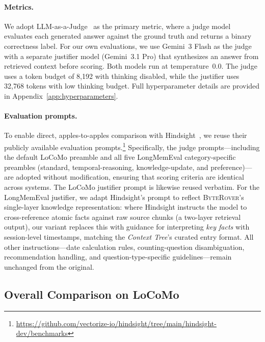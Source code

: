 \documentclass[11pt]{article}
\newcommand{\byterover}{\textsc{ByteRover}}
\newcommand{\contexttree}{\textit{Context Tree}}
\begin{document}
\paragraph{Metrics.}
We adopt LLM-as-a-Judge~\citep{zheng2023llmjudge} as the primary metric,
where a judge model evaluates each generated answer against the ground truth
and returns a binary correctness label.
For our own evaluations, we use Gemini~3 Flash as the judge
with a separate justifier model (Gemini~3.1 Pro) that synthesizes
an answer from retrieved context before scoring.
Both models run at temperature~0.0.
The judge uses a token budget of 8{,}192 with thinking disabled,
while the justifier uses 32{,}768 tokens with low thinking budget.
Full hyperparameter details are provided in Appendix~\ref{app:hyperparameters}.

\paragraph{Evaluation prompts.}
To enable direct, apples-to-apples comparison with Hindsight~\citep{latimer2025hindsight},
we reuse their publicly available evaluation prompts.\footnote{%
  \url{https://github.com/vectorize-io/hindsight/tree/main/hindsight-dev/benchmarks}}
Specifically, the judge prompts---including the default LoCoMo preamble
and all five LongMemEval category-specific preambles
(standard, temporal-reasoning, knowledge-update, and preference)---are
adopted without modification, ensuring that scoring criteria
are identical across systems.
The LoCoMo justifier prompt is likewise reused verbatim.
For the LongMemEval justifier, we adapt Hindsight's prompt
to reflect \byterover{}'s single-layer knowledge representation:
where Hindsight instructs the model to cross-reference
atomic facts against raw source chunks (a two-layer retrieval output),
our variant replaces this with guidance for interpreting
\emph{key facts} with session-level timestamps,
matching the \contexttree{}'s curated entry format.
All other instructions---date calculation rules, counting-question
disambiguation, recommendation handling, and question-type-specific
guidelines---remain unchanged from the original.


\subsection{Overall Comparison on LoCoMo}
\label{sec:locomo-results}
\end{document}

